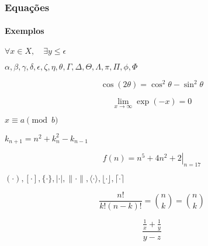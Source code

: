 \begin{frame}
\frametitle{Equações}
\framesubtitle{Exemplos}

\begin{LTXexample}
\lipsum[1][1]
$\forall x \in X, \quad \exists y \leq \epsilon$
\lipsum[1][2]
\end{LTXexample}

\begin{LTXexample}
\(\alpha, \beta, \gamma, \delta, \epsilon, \zeta, \eta, \theta, \Gamma, \Delta, \Theta, \Lambda, \pi, \Pi, \phi, \Phi\)
\end{LTXexample}

\begin{LTXexample}
\lipsum[1][1]
\begin{equation}
\cos (2\theta) = \cos^2 \theta - \sin^2 \theta
\end{equation}
\lipsum[1][2]
\end{LTXexample}

\begin{LTXexample}
\lipsum[1][1-2]
\[ \lim_{x \to \infty} \exp(-x) = 0 \]
\lipsum[1][3-4]
\end{LTXexample}

\begin{LTXexample}
$x \equiv a \pmod b$
\end{LTXexample}

\begin{LTXexample}
$k_{n+1} = n^2 + k_n^2 - k_{n-1}$
\end{LTXexample}

\begin{LTXexample}
\begin{equation}
f(n) = \left. n^5 + 4n^2 + 2 \right|_{n=17}
\end{equation}
\end{LTXexample}

\begin{LTXexample}
$(\cdot), [\cdot], \{\cdot\}, |\cdot|, \lVert\cdot\rVert, \langle\cdot\rangle, \lfloor\cdot\rfloor, \lceil\cdot\rceil$
\end{LTXexample}

\begin{LTXexample}
\begin{equation}
\frac{n!}{k!(n-k)!} = \binom{n}{k} = {n \choose k}
\end{equation}
\end{LTXexample}

\begin{LTXexample}
\begin{equation}
\frac{\frac{1}{x}+\frac{1}{y}}{y-z}
\end{equation}
\end{LTXexample}


\end{frame}
